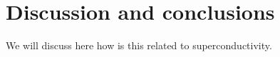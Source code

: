 \chapter{Discussion and conclusions}

We will discuss here how is this related to superconductivity.
